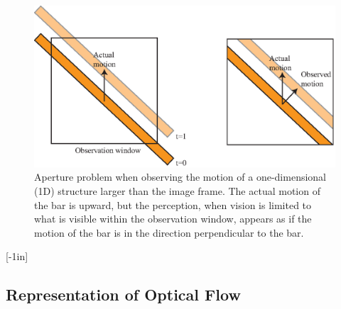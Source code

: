 \begin{figure}[t]
\centerline{
\includegraphics[width=.9\linewidth]{figures/optical_flow/apperture_problem.eps}}
\caption{Aperture problem when observing the motion of a one-dimensional (1D) structure larger than the image frame. The actual motion of the bar is upward, but the perception, when vision is limited to what is visible within the observation window, appears as if the motion of the bar is in the direction perpendicular to the bar.}
\label{fig:apperture_problem}
\end{figure}



[-1in]



\subsection{Representation of Optical Flow}

